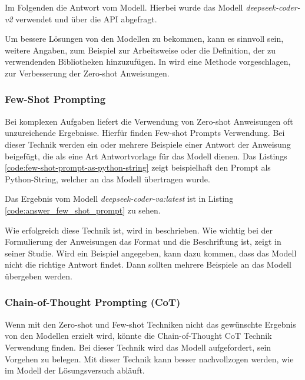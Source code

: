 Im Folgenden die Antwort vom Modell. Hierbei wurde das Modell \textit{deepseek-coder-v2} verwendet und über die API abgefragt.



Um bessere Lösungen von den Modellen zu bekommen, kann es sinnvoll sein, weitere Angaben, zum Beispiel zur Arbeitsweise oder die Definition, der zu verwendenden Bibliotheken hinzuzufügen. In \cite{wei-2021} wird eine Methode vorgeschlagen, zur Verbesserung der Zero-shot Anweisungen.


\subsubsection{Few-Shot Prompting}
Bei komplexen Aufgaben liefert die Verwendung von Zero-shot Anweisungen oft unzureichende Ergebnisse. Hierfür finden Few-shot Prompts Verwendung. Bei dieser Technik werden ein oder mehrere Beispiele einer Antwort der Anweisung beigefügt, die als eine Art Antwortvorlage für das Modell dienen. Das Listings \ref{code:few-shot-prompt-as-python-string} zeigt beispielhaft den Prompt als Python-String, welcher an das Modell übertragen wurde.\vspace{0.2cm}




Das Ergebnis vom Modell \textit{deepseek-coder-va:latest} ist in Listing \ref{code:answer_few_shot_prompt} zu sehen.



Wie erfolgreich diese Technik ist, wird in \cite{brown-2020} beschrieben. Wie wichtig bei der Formulierung der Anweisungen das Format und die Beschriftung ist, zeigt \cite{min-2022} in seiner Studie. Wird ein Beispiel angegeben, kann dazu kommen, dass das Modell nicht die richtige Antwort findet. Dann sollten mehrere Beispiele an das Modell übergeben werden.


\subsubsection{Chain-of-Thought Prompting (CoT)}
Wenn mit den Zero-shot und Few-shot Techniken nicht das gewünschte Ergebnis von den Modellen erzielt wird, könnte die Chain-of-Thought \acrshort{CoT} Technik Verwendung finden. Bei dieser Technik wird das Modell aufgefordert, sein Vorgehen zu belegen. Mit dieser Technik kann besser nachvollzogen werden, wie im Modell der Lösungsversuch abläuft.\vspace{0.2cm}

